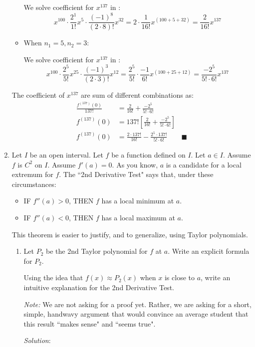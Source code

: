 \documentclass[12pt]{exam}
\newcommand*\circled[1]{\tikz[baseline=(char.base)]{
            \node[shape=circle,draw,inner sep=2pt] (char) {#1};}}
\begin{document}
\begin{enumerate}
\begin{itemize}
    We solve coefficient for $x^{137}$ in \circled{2}:
    $$
        x^{100}\cdot\frac{2^1}{1!}x^{5}\cdot\frac{(-1)^8}{(2\cdot8)!}x^{32}=2\cdot\frac{1}{16!}x^{(100+5+32)}=\frac{2}{16!}x^{137}
    $$
    \item When $n_1=5,n_2=3$:
    
    We solve coefficient for $x^{137}$ in \circled{2}:
    $$
        x^{100}\cdot\frac{2^5}{5!}x^{25}\cdot\frac{(-1)^3}{(2\cdot3)!}x^{12}=\frac{2^5}{5!}\cdot\frac{-1}{6!}x^{(100+25+12)}=\frac{-2^5}{5!\cdot6!}x^{137}
    $$
\end{itemize}
The coefficient of $x^{137}$ are sum of different combinations as:
\begin{align*}
    \frac{f^{(137)}(0)}{137!}&=\frac{2}{16!}+\frac{-2^5}{5!\cdot6!}\\
    f^{(137)}(0)&=137![\frac{2}{16!}+\frac{-2^5}{5!\cdot6!}]\\
    f^{(137)}(0)&=\frac{2\cdot137!}{16!}-\frac{2^5\cdot137!}{5!\cdot6!}\qquad\blacksquare
\end{align*}

\newpage

\item  Let $I$ be an open interval.    Let $f$ be a function defined on $I$.  Let $a \in I$.  Assume $f$ is $C^2$ on $I$.   Assume $f'(a) = 0$.   As you know, $a$ is a candidate for a local extremum for $f$.  The ``2nd Derivative Test" says that, under these circumstances:
	\begin{itemize}
		\item  IF $f''(a)>0$, THEN $f$ has a local minimum at $a$.
		\item  IF $f''(a)<0$, THEN $f$ has a local maximum at $a$.
	\end{itemize}
	 This theorem is easier to justify, and to generalize, using Taylor polynomials.
	\begin{enumerate}
		\item  \label{qu:int} Let $P_2$ be the 2nd Taylor polynomial for $f$ at $a$.  Write an explicit formula for $P_2$.
		
			Using the idea that $f(x) \approx P_2(x)$ when $x$ is close to $a$, write an intuitive explanation for the 2nd Derivative Test.  
			
			\emph{Note:}  We are not asking for a proof yet.  Rather, we are asking for a short, simple, handwavy argument that would convince an average student that this result ``makes sense" and ``seems true".
			
			\emph{Solution}:
			

\end{enumerate}
\end{enumerate}
\end{document}
